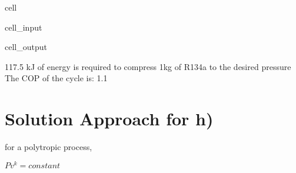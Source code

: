 \documentclass[letterpaper,10pt,english]{jupyterBook}
\begin{document}
\begin{sphinxuseclass}{cell}\begin{sphinxVerbatimInput}

\begin{sphinxuseclass}{cell_input}
\begin{sphinxVerbatim}[commandchars=\\\{\}]
    
    
 
 
\end{sphinxVerbatim}

\end{sphinxuseclass}\end{sphinxVerbatimInput}
\begin{sphinxVerbatimOutput}

\begin{sphinxuseclass}{cell_output}
\begin{sphinxVerbatim}[commandchars=\\\{\}]
117.5 kJ of energy is required to compress 1kg of R134\PYGZhy{}a to the desired pressure
The COP of the cycle is: 1.1
\end{sphinxVerbatim}

\end{sphinxuseclass}\end{sphinxVerbatimOutput}

\end{sphinxuseclass}

\section{Solution Approach for h)}
\label{\detokenize{notebooks/Chapter5/CH5-Q5:solution-approach-for-h}}
\sphinxAtStartPar
for a polytropic process,

\sphinxAtStartPar
\(Pv^k=constant\)
\end{document}
